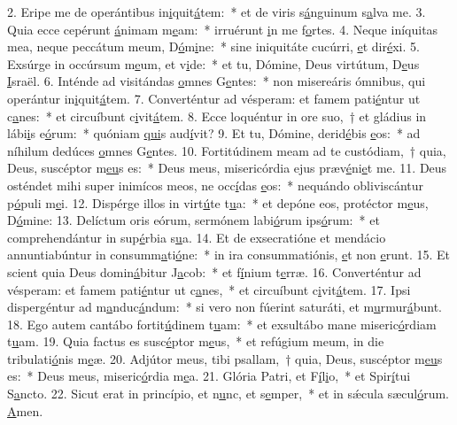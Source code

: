2. Eripe me de operántibus in\uline{i}quit\uline{á}tem:~* et de viris s\uline{á}nguinum s\uline{a}lva me.
3. Quia ecce cepérunt \uline{á}nimam m\uline{e}am:~* irruérunt \uline{i}n me f\uline{o}rtes.
4. Neque iníquitas mea, neque peccátum meum, D\uline{ó}m\uline{i}ne:~* sine iniquitáte cucúrri, \uline{e}t dir\uline{é}xi.
5. Exsúrge in occúrsum m\uline{e}um, et v\uline{i}de:~* et tu, Dómine, Deus virtútum, D\uline{e}us \uline{I}sraël.
6. Inténde ad visitándas \uline{o}mnes G\uline{e}ntes:~* non misereáris ómnibus, qui operántur in\uline{i}quit\uline{á}tem.
7. Converténtur ad vésperam: et famem pati\uline{é}ntur ut c\uline{a}nes:~* et circuíbunt c\uline{i}vit\uline{á}tem.
8. Ecce loquéntur in ore suo,~† et gládius in lábi\uline{i}s e\uline{ó}rum:~* quóniam \uline{qui}s aud\uline{í}vit?
9. Et tu, Dómine, derid\uline{é}bis \uline{e}os:~* ad níhilum dedúces \uline{o}mnes G\uline{e}ntes.
10. Fortitúdinem meam ad te custódiam,~† quia, Deus, suscéptor m\uline{e}\uline{u}s es:~* Deus meus, misericórdia ejus præv\uline{é}ni\uline{e}t me.
11. Deus osténdet mihi super inimícos meos, ne occ\uline{í}das \uline{e}os:~* nequándo obliviscántur p\uline{ó}puli m\uline{e}i.
12. Dispérge illos in virt\uline{ú}te t\uline{u}a:~* et depóne eos, protéctor m\uline{e}us, D\uline{ó}mine:
13. Delíctum oris eórum, sermónem labi\uline{ó}rum ips\uline{ó}rum:~* et comprehendántur in sup\uline{é}rbia s\uline{u}a.
14. Et de exsecratióne et mendácio annuntiabúntur in consumm\uline{a}ti\uline{ó}ne:~* in ira consummatiónis, \uline{e}t non \uline{e}runt.
15. Et scient quia Deus domin\uline{á}bitur J\uline{a}cob:~* et f\uline{í}nium t\uline{e}rræ.
16. Converténtur ad vésperam: et famem pati\uline{é}ntur ut c\uline{a}nes,~* et circuíbunt c\uline{i}vit\uline{á}tem.
17. Ipsi dispergéntur ad m\uline{a}nduc\uline{á}ndum:~* si vero non fúerint saturáti, et m\uline{u}rmur\uline{á}bunt.
18. Ego autem cantábo fortit\uline{ú}dinem t\uline{u}am:~* et exsultábo mane miseric\uline{ó}rdiam t\uline{u}am.
19. Quia factus es susc\uline{é}ptor m\uline{e}us,~* et refúgium meum, in die tribulati\uline{ó}nis m\uline{e}æ.
20. Adjútor meus, tibi psallam,~† quia, Deus, suscéptor m\uline{e}\uline{u}s es:~* Deus meus, miseric\uline{ó}rdia m\uline{e}a.
21. Glória Patri, et F\uline{í}l\uline{i}o,~* et Spir\uline{í}tui S\uline{a}ncto.
22. Sicut erat in princípio, et n\uline{u}nc, et s\uline{e}mper,~* et in sǽcula sæcul\uline{ó}rum. \uline{A}men.
